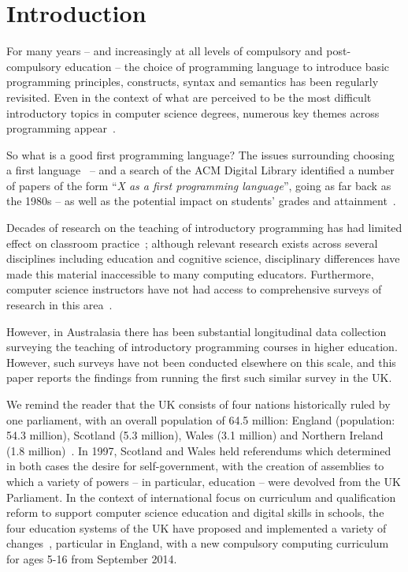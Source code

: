 \documentclass{sig-alternate}
\begin{document}
\section{Introduction}\label{intro}

For many years -- and increasingly at all levels of compulsory and
post-compulsory education -- the choice of programming language to
introduce basic programming principles, constructs, syntax and
semantics has been regularly revisited. Even in the context of what
are perceived to be the most difficult introductory topics in computer
science degrees, numerous key themes across programming
appear~\cite{dale:2006}. 

So what is a good first programming language? The issues surrounding
choosing a first language~\cite{gupta:2004,kaplan:2010} -- and a
search of the ACM Digital Library identified a number of papers of the
form ``{\emph{X as a first programming language}}'', going as far back
as the 1980s -- as well as the potential impact on students' grades
and attainment~\cite{ivanovic-et-al:2015}.

Decades of research on the teaching of introductory programming has
had limited effect on classroom practice~\cite{pears-et-al:2007};
although relevant research exists across several disciplines including
education and cognitive science, disciplinary differences have made
this material inaccessible to many computing educators. Furthermore,
computer science instructors have not had access to comprehensive
surveys of research in this
area~\cite{mccracken-et-al:2001,pears-et-al:2007}.

However, in Australasia there has been substantial longitudinal data
collection~\cite{deraadt-et-al:2004,mason-et-al:2012,mason+cooper:2014}
surveying the teaching of introductory programming courses in higher
education. However, such surveys have not been conducted elsewhere on
this scale, and this paper reports the findings from running the first
such similar survey in the UK.

We remind the reader that the UK consists of four nations historically
ruled by one parliament, with an overall population of 64.5 million:
England (population: 54.3 million), Scotland (5.3 million), Wales (3.1
million) and Northern Ireland (1.8 million)~\cite{onspop:2016}. In
1997, Scotland and Wales held referendums which determined in both
cases the desire for self-government, with the creation of assemblies
to which a variety of powers -- in particular, education -- were
devolved from the UK Parliament. In the context of international focus
on curriculum and qualification reform to support computer science
education and digital skills in schools, the four education systems of
the UK have proposed and implemented a variety of
changes~\cite{rs:2012,brown-et-al-toce2014}, particular in England,
with a new compulsory computing curriculum for ages 5-16 from
September 2014.
\end{document}
